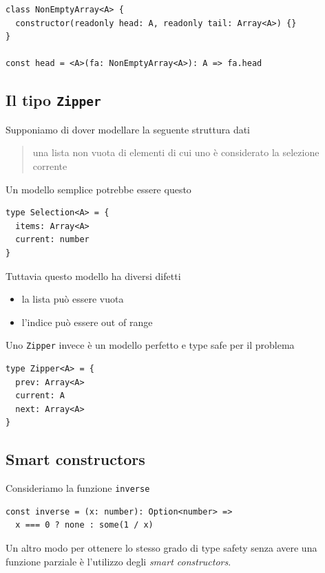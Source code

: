 \documentclass[12pt]{article}
\begin{document}
\begin{verbatim}
class NonEmptyArray<A> {
  constructor(readonly head: A, readonly tail: Array<A>) {}
}

const head = <A>(fa: NonEmptyArray<A>): A => fa.head
\end{verbatim}

\subsection{Il tipo \texttt{Zipper}}

Supponiamo di dover modellare la seguente struttura dati

\begin{quote}
una lista non vuota di elementi di cui uno è considerato la selezione corrente
\end{quote}

Un modello semplice potrebbe essere questo

\begin{verbatim}
type Selection<A> = {
  items: Array<A>
  current: number
}
\end{verbatim}

Tuttavia questo modello ha diversi difetti

\begin{itemize}
  \item la lista può essere vuota
  \item l'indice può essere out of range
\end{itemize}

Uno \texttt{Zipper} invece è un modello perfetto e type safe per il problema

\begin{verbatim}
type Zipper<A> = {
  prev: Array<A>
  current: A
  next: Array<A>
}
\end{verbatim}

\subsection{Smart constructors}

Consideriamo la funzione \texttt{inverse}

\begin{verbatim}
const inverse = (x: number): Option<number> =>
  x === 0 ? none : some(1 / x)
\end{verbatim}

Un altro modo per ottenere lo stesso grado di type safety senza avere una funzione parziale è l'utilizzo degli \emph{smart constructors}.
\end{document}
